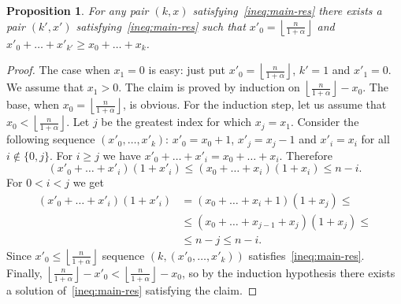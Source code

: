 \documentclass[12pt]{amsart}
\renewcommand{\leq}{\leqslant}
\renewcommand{\geq}{\geqslant}
\newtheorem{prop}[theorem]{Proposition}
\theoremstyle{definition}
\begin{document}
\begin{prop}\label{prop:positiv:x0}
For any pair $(k,x)$ satisfying~\eqref{ineq:main-res} there exists a pair $(k',x')$ 
satisfying~\eqref{ineq:main-res} such that $x'_0 = \left\lfloor\frac{n}{1+\alpha}\right\rfloor$ and $x'_0+\ldots+x'_{k'} \geq x_0+\ldots +x_{k}$.
\end{prop}
\begin{proof}
The case when $x_1=0$ is easy: 
just put $x'_0 = \left\lfloor\frac{n}{1+\alpha}\right\rfloor$, $k'=1$ and $x'_1=0$.
We assume that $x_1>0$. 
The claim is proved by induction on $\left\lfloor\frac{n}{1+\alpha}\right\rfloor - x_0$.
The base, when $x_0= \left\lfloor\frac{n}{1+\alpha}\right\rfloor$, is obvious.
For the induction step, let us assume that $x_0<\left\lfloor\frac{n}{1+\alpha}\right\rfloor$.
Let $j$ be the greatest index for which $x_j=x_1$.
Consider the following sequence $(x'_0,\ldots,x'_k)$: $x'_0 = x_0+1$, $x'_j = x_j-1$ and $x'_i = x_i$ for all $i\notin\{0,j\}$.
For $i\geq j$ we have $x'_0+\ldots+x'_i = x_0+\ldots+x_i$.
Therefore 
$$
  (x'_0+\ldots+x'_i)(1+x'_i)\leq (x_0+\ldots+x_i)(1+x_i) \leq n-i.
$$
For  $0<i<j$ we get
\begin{align*}
 (x'_0+\ldots+x'_i)(1+x'_i) &=  (x_0+\ldots+x_{i}+1)(1+x_j) \leq\\
			     &\leq (x_0+\ldots+x_{j-1}+x_j)(1+x_j)\leq \\
			     &\leq n-j \leq n-i.
\end{align*}
Since $x'_0\leq \left\lfloor\frac{n}{1+\alpha}\right\rfloor$ sequence $(k,(x'_0,\ldots,x'_k))$ satisfies~\eqref{ineq:main-res}.
Finally, $\left\lfloor\frac{n}{1+\alpha}\right\rfloor - x'_0 <  \left\lfloor\frac{n}{1+\alpha}\right\rfloor - x_0$, so by the induction hypothesis 
there exists a solution of~\eqref{ineq:main-res} satisfying the claim.
\end{proof}
\end{document}
